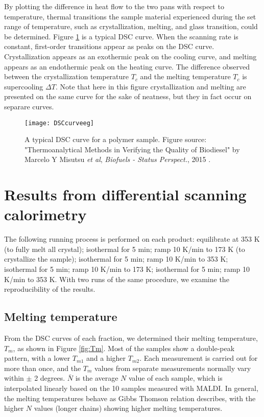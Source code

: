 By plotting the difference in heat flow to the two pans with respect to temperature, thermal transitions the sample material experienced during the set range of temperature, such as crystallization, melting, and glass transition, could be determined. Figure \ref{fig:DSCcurveeg} is a typical DSC curve. When the scanning rate is constant, first-order transitions appear as peaks on the DSC curve. Crystallization appears as an exothermic peak on the cooling curve, and melting appears as an endothermic peak on the heating curve. The difference observed between the crystallization temperature $T_{c}$ and the melting temperature $T_{c}$ is supercooling $\Delta T$. Note that here in this figure crystallization and melting are presented on the same curve for the sake of neatness, but they in fact occur on separare curves.

\begin{figure}[H]
\center
\vspace{1 cm}
\texttt{[image: DSCcurveeg]}
\caption[A typical DSC curve for a polymer sample.]{A typical DSC curve for a polymer sample. Figure source: "Thermoanalytical Methods in Verifying the Quality of Biodiesel" by Marcelo Y Misutsu \textit{et al}, \textit{Biofuels - Status Perspect.}, 2015 \cite{Misutsu2015}.}
\label{fig:DSCcurveeg}
\end{figure}

\section{Results from differential scanning calorimetry}

The following running process is performed on each product: equilibrate at 353 K (to fully melt all crystal); isothermal for 5 min; ramp 10 K/min to 173 K (to crystallize the sample); isothermal for 5 min; ramp 10 K/min to 353 K; isothermal for 5 min; ramp 10 K/min to 173 K; isothermal for 5 min; ramp 10 K/min to 353 K. With two runs of the same procedure, we examine the reproducibility of the results.

\subsection{Melting temperature}

From the DSC curves of each fraction, we determined their melting temperature, $T_{m}$, as shown in Figure \ref{fig:Tm}. Most of the samples show a double-peak pattern, with a lower $T_{m1}$ and a higher $T_{m2}$. Each measurement is carried out for more than once, and the $T_{m}$ values from separate measurements normally vary within $\pm$ 2 degrees. $\bar{N}$ is the average $N$ value of each sample, which is interpolated linearly based on the 10 samples measured with MALDI. In general, the melting temperatures behave as Gibbs Thomson relation describes, with the higher $N$ values (longer chains) showing higher melting temperatures.

